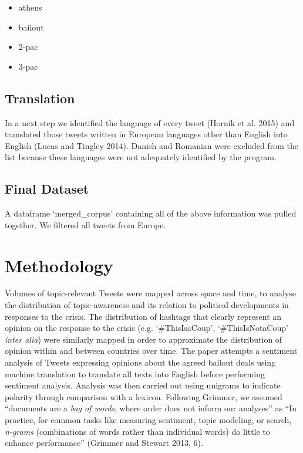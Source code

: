 \documentclass[]{article}
\begin{document}
\begin{itemize}
\itemsep1pt\parskip0pt
\item
  athens
\item
  bailout
\item
  2-pac
\item
  3-pac
\end{itemize}

\subsection{Translation}\label{translation}

In a next step we identified the language of every tweet (Hornik et al.
2015) and translated those tweets written in European languages other
than English into English (Lucas and Tingley 2014). Danish and Romanian
were excluded from the list because these languages were not adequately
identified by the program.

\subsection{Final Dataset}\label{final-dataset}

A dataframe `merged\_corpus' containing all of the above information was
pulled together. We filtered all tweets from Europe.

\section{Methodology}\label{methodology}

Volumes of topic-relevant Tweets were mapped across space and time, to
analyse the distribution of topic-awareness and its relation to
political developments in responses to the crisis. The distribution of
hashtags that clearly represent an opinion on the response to the crisis
(e.g. `\#ThisIsaCoup', `\#ThisIsNotaCoup' \emph{inter alia}) were
similarly mapped in order to approximate the distribution of opinion
within and between countries over time. The paper attempts a sentiment
analysis of Tweets expressing opinions about the agreed bailout deals
using machine translation to translate all texts into English before
performing sentiment analysis. Analysis was then carried out using
unigrams to indicate polarity through comparison with a lexicon.
Following Grimmer, we assumed ``documents are a \emph{bag of words},
where order does not inform our analyses'' as ``In practice, for common
tasks like measuring sentiment, topic modeling, or search,
\emph{n-grams} (combinations of words rather than individual words) do
little to enhance performance'' (Grimmer and Stewart 2013, 6).
\end{document}
